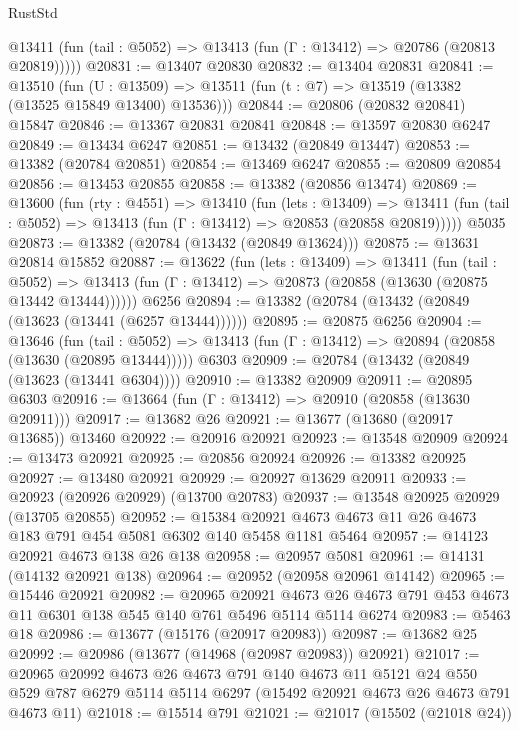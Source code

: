 \begin{lexlean}{RustStd}
\begin{coremodule}
      @13411 (fun (tail : @5052) => @13413 (fun (Γ : @13412) => @20786 (@20813 @20819)))))
@20831 := @13407 @20830
@20832 := @13404 @20831
@20841 := @13510
    (fun (U : @13509) => @13511 (fun (t : @7) => @13519 (@13382 (@13525 @15849 @13400) @13536)))
@20844 := @20806 (@20832 @20841) @15847
@20846 := @13367 @20831 @20841
@20848 := @13597 @20830 @6247
@20849 := @13434 @6247
@20851 := @13432 (@20849 @13447)
@20853 := @13382 (@20784 @20851)
@20854 := @13469 @6247
@20855 := @20809 @20854
@20856 := @13453 @20855
@20858 := @13382 (@20856 @13474)
@20869 := @13600
    (fun (rty : @4551) =>
    @13410
      (fun (lets : @13409) =>
      @13411 (fun (tail : @5052) => @13413 (fun (Γ : @13412) => @20853 (@20858 @20819)))))
    @5035
@20873 := @13382 (@20784 (@13432 (@20849 @13624)))
@20875 := @13631 @20814 @15852
@20887 := @13622
    (fun (lets : @13409) =>
    @13411
      (fun (tail : @5052) =>
      @13413 (fun (Γ : @13412) => @20873 (@20858 (@13630 (@20875 @13442 @13444))))))
    @6256
@20894 := @13382 (@20784 (@13432 (@20849 (@13623 (@13441 (@6257 @13444))))))
@20895 := @20875 @6256
@20904 := @13646
    (fun (tail : @5052) => @13413 (fun (Γ : @13412) => @20894 (@20858 (@13630 (@20895 @13444)))))
    @6303
@20909 := @20784 (@13432 (@20849 (@13623 (@13441 @6304))))
@20910 := @13382 @20909
@20911 := @20895 @6303
@20916 := @13664 (fun (Γ : @13412) => @20910 (@20858 (@13630 @20911)))
@20917 := @13682 @26
@20921 := @13677 (@13680 (@20917 @13685)) @13460
@20922 := @20916 @20921
@20923 := @13548 @20909
@20924 := @13473 @20921
@20925 := @20856 @20924
@20926 := @13382 @20925
@20927 := @13480 @20921
@20929 := @20927 @13629 @20911
@20933 := @20923 (@20926 @20929) (@13700 @20783)
@20937 := @13548 @20925 @20929 (@13705 @20855)
@20952 := @15384 @20921 @4673 @4673 @11 @26 @4673 @183 @791 @454 @5081 @6302 @140 @5458 @1181 @5464
@20957 := @14123 @20921 @4673 @138 @26 @138
@20958 := @20957 @5081
@20961 := @14131 (@14132 @20921 @138)
@20964 := @20952 (@20958 @20961 @14142)
@20965 := @15446 @20921
@20982 := @20965
    @20921
    @4673
    @26
    @4673
    @791
    @453
    @4673
    @11
    @6301
    @138
    @545
    @140
    @761
    @5496
    @5114
    @5114
    @6274
@20983 := @5463 @18
@20986 := @13677 (@15176 (@20917 @20983))
@20987 := @13682 @25
@20992 := @20986 (@13677 (@14968 (@20987 @20983)) @20921)
@21017 := @20965
    @20992
    @4673
    @26
    @4673
    @791
    @140
    @4673
    @11
    @5121
    @24
    @550
    @529
    @787
    @6279
    @5114
    @5114
    @6297
    (@15492 @20921 @4673 @26 @4673 @791 @4673 @11)
@21018 := @15514 @791
@21021 := @21017 (@15502 (@21018 @24))

\end{coremodule}
\end{lexlean}
